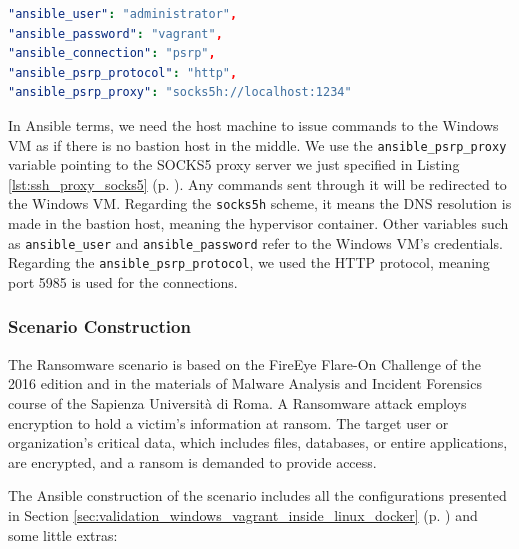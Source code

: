 \begin{lstlisting}[language=yaml,caption=Ansible Variables - Hypervisor Container.,numbers=none,label={lst:ansible_psrp_connector_variables}]
"ansible_user": "administrator",
"ansible_password": "vagrant",
"ansible_connection": "psrp",
"ansible_psrp_protocol": "http",
"ansible_psrp_proxy": "socks5h://localhost:1234"
\end{lstlisting}

In Ansible terms, we need the host machine to issue commands to the Windows VM as if there is no bastion host in the middle. We use the \texttt{ansible\_psrp\_proxy} variable pointing to the SOCKS5 proxy server we just specified in Listing \ref{lst:ssh_proxy_socks5} (p. \pageref{lst:ssh_proxy_socks5}). Any commands sent through it will be redirected to the Windows VM. Regarding the \texttt{socks5h} scheme, it means the DNS resolution is made in the bastion host, meaning the hypervisor container. Other variables such as \texttt{ansible\_user} and \texttt{ansible\_password} refer to the Windows VM's credentials. Regarding the \texttt{ansible\_psrp\_protocol}, we used the HTTP protocol, meaning port 5985 is used for the connections.

\subsubsection{Scenario Construction} \label{sec:validation_ransomware_construction}

The Ransomware scenario is based on the FireEye Flare-On Challenge of the 2016 edition and in the materials of Malware Analysis and Incident Forensics course of the Sapienza Università di Roma. A Ransomware attack employs encryption to hold a victim's information at ransom. The target user or organization's critical data, which includes files, databases, or entire applications, are encrypted, and a ransom is demanded to provide access. 

The Ansible construction of the scenario includes all the configurations presented in Section \ref{sec:validation_windows_vagrant_inside_linux_docker} (p. \pageref{sec:validation_windows_vagrant_inside_linux_docker}) and some little extras:

